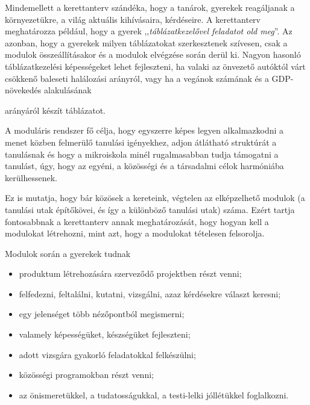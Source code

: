 Mindemellett a kerettanterv szándéka, hogy a tanárok, gyerekek
reagáljanak a környezetükre, a világ aktuális kihívásaira, kérdéseire. A
kerettanterv meghatározza például, hogy a gyerek ,,\emph{táblázatkezelővel
      feladatot old meg}''. Az azonban, hogy a gyerekek milyen táblázatokat
szerkesztenek szívesen, csak a
modulok összeállításakor és a modulok elvégzése során derül ki.
Nagyon hasonló táblázatkezelési képességeket lehet
fejleszteni, ha valaki az önvezető autóktól várt csökkenő baleseti halálozási
arányról, vagy ha a vegánok számának és a GDP-növekedés alakulásának

arányáról készít táblázatot.

A moduláris rendszer fő célja,
hogy egyszerre képes legyen alkalmazkodni a menet közben felmerülő
tanulási igényekhez,
adjon átlátható struktúrát a tanulásnak
és hogy a mikroiskola minél rugalmasabban tudja támogatni a tanulást,
úgy, hogy az egyéni, a közösségi és a társadalmi célok harmóniába
kerülhessenek.

Ez is mutatja, hogy bár közösek a kereteink, végtelen az elképzelhető
modulok (a tanulási utak építőkövei, és így a különböző tanulási utak)
száma. Ezért tartja fontosabbnak a kerettanterv annak meghatározását,
hogy
hogyan kell a modulokat létrehozni, mint azt, hogy a modulokat tételesen
felsorolja.

Modulok során a gyerekek tudnak

\begin{itemize}
      \item produktum létrehozására szerveződő projektben részt venni;

      \item felfedezni, feltalálni, kutatni, vizsgálni, azaz kérdésekre választ
            keresni;

      \item egy jelenséget több nézőpontból megismerni;

      \item valamely képességüket, készségüket fejleszteni;

      \item adott vizsgára gyakorló feladatokkal felkészülni;

      \item közösségi programokban részt venni;

      \item az önismeretükkel, a tudatosságukkal, a testi-lelki jóllétükkel
            foglalkozni.
\end{itemize}

